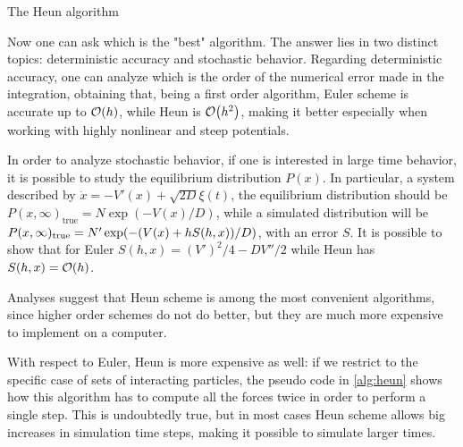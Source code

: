 \documentclass[../../master_thesis_np.tex]{subfiles}
\begin{document}
		\begin{algorithm}
			\caption{The Heun algorithm} \label{alg:heun}	
			\begin{algorithmic}[1]
				\EndFor
				\EndFor
			\end{algorithmic}
		\end{algorithm}
		Now one can ask which is the "best" algorithm. The answer lies in two distinct topics: deterministic accuracy and stochastic behavior. Regarding deterministic accuracy, one can analyze which is the order of the numerical error made in the integration, obtaining that, being a first order algorithm, Euler scheme is accurate up to $\order{h}$, while Heun is $\order{h^2}$, making it better especially when working with highly nonlinear and steep potentials.
		
		In order to analyze stochastic behavior, if one is interested in large time behavior, it is possible to study the equilibrium distribution $P(x)$. In particular, a system described by $\dot{x} = -V'(x) + \sqrt{2D}\xi(t)$, the equilibrium distribution should be $P(x, \infty)_{\text{true}} = N \exp(-V(x)/D)$, while a simulated distribution will be $P(x, \infty)_{\text{true}} = N' \exp(-\qty(V(x) + hS(h,x))/D)$, with an error $S$. It is possible to show \cite{mannella_integration_2011} that for Euler $S(h,x) = (V')^2/4 - DV''/2$ while Heun has $S(h,x) = \order{h}$.
		
		Analyses suggest that Heun scheme is among the most convenient algorithms, since higher order schemes do not do better, but they are much more expensive to implement on a computer. 
		
		With respect to Euler, Heun is more expensive as well: if we restrict to the specific case of sets of interacting particles, the pseudo code in \ref{alg:heun} shows how this algorithm has to compute all the forces twice in order to perform a single step. This is undoubtedly true, but in most cases Heun scheme allows big increases in simulation time steps, making it possible to simulate larger times.		
		
\end{document}
